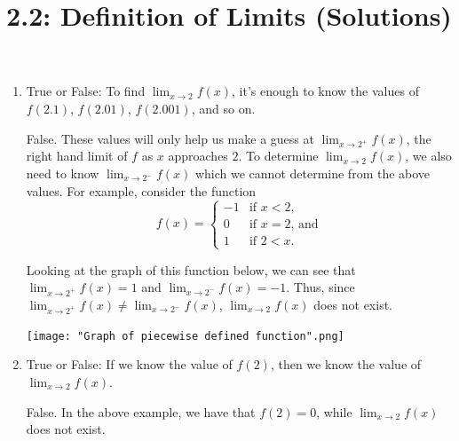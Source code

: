 \documentclass[nooutcomes]{ximera}
\title{2.2:  Definition of Limits (Solutions)}
\begin{document}
\begin{abstract}		\end{abstract}
\maketitle

\begin{problem} \hfil
	\begin{enumerate}

	\item  True or False: To find $\lim_{x \to 2} f(x)$, it's enough to know the values of $f(2.1)$, $f(2.01)$, $f(2.001)$, and so on.
	\begin{freeResponse}
	 False.  These values will only help us make a guess at $\lim_{x \to 2^+} f(x)$, the right hand limit of $f$ as $x$ approaches $2$.  To determine $\lim_{x \to 2} f(x)$, we also need to know $\lim_{x \to 2^-} f(x)$ which we cannot determine from the above values.  For example, consider the function
	 	        \[
          f(x) =
        \begin{cases}
         -1 & \mbox{if $x < 2$,}\\
          0 & \mbox{if $x = 2$, and}\\
          1 & \mbox{if $2 < x$.}
        \end{cases}
        \]

	Looking at the graph of this function below, we can see that $\lim_{x \to 2^+} f(x) = 1$ and $\lim_{x \to 2^-} f(x) = -1$.  Thus, since $\lim_{x \to 2^+} f(x) \neq \lim_{x \to 2^-} f(x)$, $\lim_{x \to 2} f(x)$ does not exist.
	
		\begin{image}
          \texttt{[image: "Graph of piecewise defined function".png]}
		\end{image}
	\end{freeResponse}
	
	
	
	\item  True or False: If we know the value of $f(2)$, then we know the value of $\lim_{x \to 2} f(x)$.
		\begin{freeResponse}
		False.  In the above example, we have that $f(2) = 0$, while $\lim_{x \to 2} f(x)$ does not exist.
		\end{freeResponse}
	\end{enumerate}


\end{problem}
\end{document}
